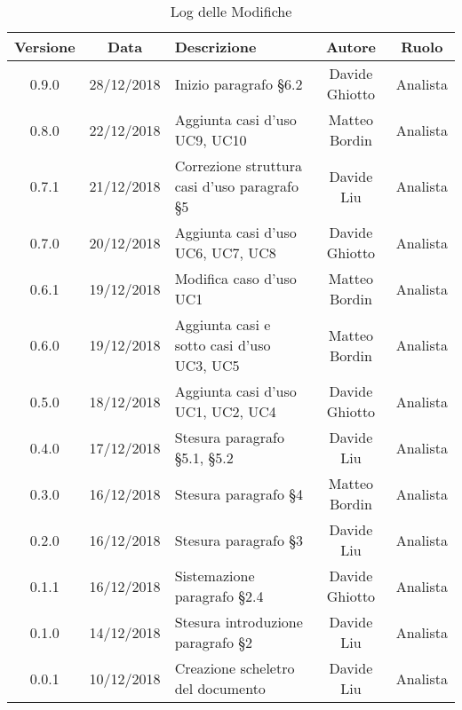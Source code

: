 \begin{table}[h!] %
            \centering
            \renewcommand{\arraystretch}{2}
            \begin{tabular}{|c|c|p{5cm}|c|c|} %
                \rowcolor{orange!50} %
        		\hline
        		\textbf{Versione} & \textbf{Data} & \textbf{Descrizione} & \textbf{Autore} & \textbf{Ruolo} \\
                \hline
                0.9.0 & 28/12/2018 & Inizio paragrafo §6.2 & Davide Ghiotto & Analista \\
                \hline
                0.8.0 & 22/12/2018 & Aggiunta casi d’uso UC9, UC10 & Matteo Bordin & Analista \\
                \hline
                0.7.1 & 21/12/2018 & Correzione struttura casi d’uso paragrafo §5 & Davide Liu & Analista \\
                \hline
                0.7.0 & 20/12/2018 & Aggiunta casi d’uso UC6, UC7, UC8 & Davide Ghiotto & Analista \\
                \hline
                0.6.1 & 19/12/2018 & Modifica caso d’uso UC1 & Matteo Bordin & Analista \\
                \hline
                0.6.0 & 19/12/2018 & Aggiunta casi e sotto casi d’uso UC3, UC5 & Matteo Bordin & Analista \\
                \hline
                0.5.0 & 18/12/2018 & Aggiunta casi d’uso UC1, UC2, UC4 & Davide Ghiotto & Analista \\
                \hline
                0.4.0 & 17/12/2018 & Stesura paragrafo §5.1, §5.2 & Davide Liu & Analista \\
                \hline
                0.3.0 & 16/12/2018 & Stesura paragrafo §4 & Matteo Bordin & Analista \\
                \hline
                0.2.0 & 16/12/2018 & Stesura paragrafo §3 & Davide Liu & Analista \\
                \hline
                0.1.1 & 16/12/2018 & Sistemazione  paragrafo §2.4 & Davide Ghiotto & Analista \\
                \hline 
                0.1.0 & 14/12/2018 & Stesura introduzione paragrafo §2 & Davide Liu & Analista \\
                \hline
                0.0.1 & 10/12/2018 & Creazione scheletro del documento & Davide Liu & Analista \\
                \hline
                
                
                
                
        \end{tabular}
        \caption{Log delle Modifiche} %
        \label{tab:Log delle modifiche2}
\end{table}
